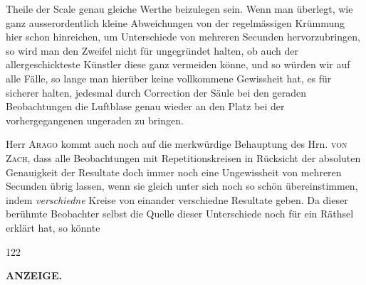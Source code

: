 Theile der Scale genau gleiche Werthe beizulegen sein. Wenn man überlegt, wie ganz ausserordentlich kleine Abweichungen von der regelmässigen Krümmung hier schon hinreichen, um Unterschiede von mehreren Secunden hervorzubringen, so wird man den Zweifel nicht für ungegründet halten, ob auch der allergeschickteste Künstler diese ganz vermeiden könne, und so würden wir auf alle Fälle, so lange man hierüber keine vollkommene Gewissheit hat, es für sicherer halten, jedesmal durch Correction der Säule bei den geraden Beobachtungen die Luftblase genau wieder an den Platz bei der vorhergegangenen ungeraden zu bringen.

Herr \textsc{Arago} kommt auch noch auf die merkwürdige Behauptung des Hrn. \textsc{von Zach}, dass alle Beobachtungen mit Repetitionskreisen in Rücksicht der absoluten Genauigkeit der Resultate doch immer noch eine Ungewissheit von mehreren Secunden übrig lassen, wenn sie gleich unter sich noch so schön übereinstimmen, indem \emph{verschiedne} Kreise von einander verschiedne Resultate geben. Da dieser berühmte Beobachter selbst die Quelle dieser Unterschiede noch für ein Räthsel erklärt hat, so könnte
\par
\vfill{}\hfill{\small 122}\hspace*{.18\linewidth}\par
\clearpage
\thispagestyle{empty}
\noindent{}%
%
\parbox[t]{\dimexpr\linewidth-24mm\relax}{\centering\footnotesize\bfseries ANZEIGE.}%
\makebox[12mm][r]{}\par\nobreak\medskip
